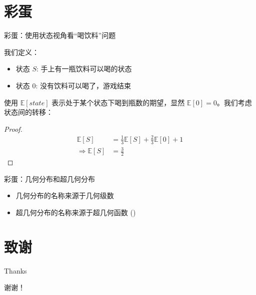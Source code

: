 \documentclass{beamer}
\newcommand{\E}{\mathbb{E}}
\begin{document}
\section{彩蛋}

\begin{frame}{彩蛋：使用状态视角看``喝饮料''问题}
    \begin{definition}
        我们定义：
        \begin{itemize}
            \item 状态 $S$: 手上有一瓶饮料可以喝的状态
            \item 状态 0: 没有饮料可以喝了，游戏结束
        \end{itemize}
    \end{definition}
    \pause
    使用 $\E[state]$ 表示处于某个状态下喝到瓶数的期望，显然 $\E[0] = 0$。我们考虑状态间的转移：
    \pause
    \begin{proof}
    $$
        \begin{aligned}
            \E[S] &= \frac13 \E[S] + \frac23 \E[0] + 1 \\
            \Rightarrow \E[S] &= \frac32
        \end{aligned}
    $$
    \end{proof}
\end{frame}

\begin{frame}{彩蛋：几何分布和超几何分布}
    \begin{itemize}
        \item 几何分布的名称来源于几何级数
        \item 超几何分布的名称来源于超几何函数 (\href{https://en.wikipedia.org/wiki/Generalized_hypergeometric_function}{\color{blue}{Wikipedia}})
    \end{itemize}
\end{frame}

\section{致谢}

\begin{frame}{Thanks}
    \begin{center}
        {\Huge{谢谢！}}
    \end{center}
\end{frame}
\end{document}
